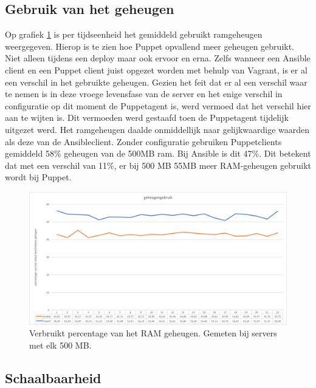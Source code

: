 \subsection{Gebruik van het geheugen}

Op grafiek \ref{fig:geheugengebruik} is per tijdseenheid het gemiddeld gebruikt ramgeheugen weergegeven. Hierop is te zien hoe Puppet opvallend meer geheugen gebruikt. Niet alleen tijdens een deploy maar ook ervoor en erna. Zelfs wanneer een Ansible client en een Puppet client juist opgezet worden met behulp van Vagrant, is er al een verschil in het gebruikte geheugen. Gezien het feit dat er al een verschil waar te nemen is in deze vroege levensfase van de server en het enige verschil in configuratie op dit moment de Puppetagent is, werd vermoed dat het verschil hier aan te wijten is. Dit vermoeden werd gestaafd toen de Puppetagent tijdelijk uitgezet werd. Het ramgeheugen daalde onmiddellijk naar gelijkwaardige waarden als deze van de Ansibleclient. Zonder configuratie gebruiken Puppetclients gemiddeld 58\% geheugen van de 500MB ram. Bij Ansible is dit 47\%. Dit betekent dat met een verschil van 11\%, er bij 500 MB 55MB meer RAM-geheugen gebruikt wordt bij Puppet.


\begin{figure}
  \includegraphics[width=\linewidth]{img/geheugengebruik}
 \caption{Verbruikt percentage van het RAM geheugen. Gemeten bij servers met elk 500 MB. }  
  \label{fig:geheugengebruik}
\end{figure}


\subsection{Schaalbaarheid}
\label{sec:schaalbaarheid}


